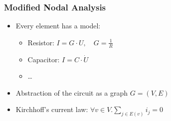 \begin{frame}
\frametitle{Modified Nodal Analysis}
\begin{itemize}[<+->]
    \item Every element has a model:
        \begin{itemize}
            \item{Resistor: \(I = G \cdot U,\quad G=\frac{1}{R}\)
            }
            \item Capacitor: \(I = C \cdot \dot{U}\)
            \item \dots
        \end{itemize}
    \item Abstraction of the circuit as a graph \(G = (V,E)\)
    \item Kirchhoff's current law: \(\forall v \in V. \sum_{j \in E(v)} i_{j} = 0\)
\end{itemize}
\end{frame}


